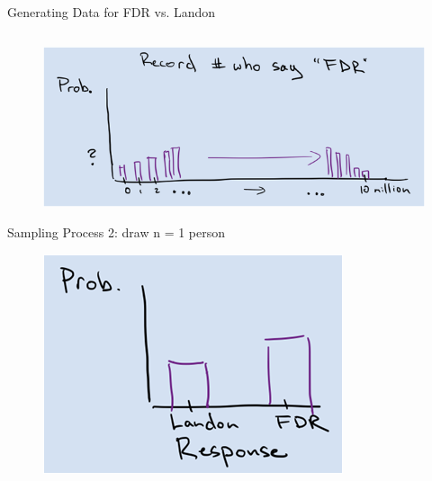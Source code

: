 \documentclass[aspectratio=169]{../latex_main/tntbeamer}  %
\begin{document}
\begin{frame}{Generating Data for FDR vs. Landon}
\begin{columns}
\begin{column}{.5\textwidth}
	           
                \begin{figure}
                    \includegraphics[scale=.4]{Bild14}
                \end{figure}
                Sampling Process 2: draw n = 1 person
                \begin{figure}
                    \includegraphics[scale=.4]{Bild15}
                \end{figure}
	        \end{column}
	    \end{columns}
	\end{frame}
	
\end{document}
